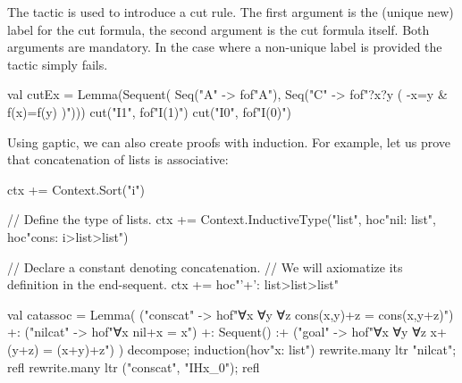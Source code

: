 \documentclass[a4paper,11pt]{article}
\newcommand{\cli}[1]{{\ttfamily {#1}}}
\begin{document}
The \cli{cut} tactic is used to introduce a cut rule. The first argument is the
(unique new) label for the cut formula, the second argument is the cut formula
itself. Both arguments are mandatory. In the case where a non-unique label is
provided the tactic simply fails.
\begin{tacticslisting}
val cutEx = Lemma(Sequent(
    Seq("A" -> fof"A"),
    Seq("C" -> fof"?x?y ( -x=y & f(x)=f(y) )"))) {
  cut("I1", fof"I(1)")
  cut("I0", fof"I(0)")
}
\end{tacticslisting}

Using gaptic, we can also create proofs with induction.  For example, let us
prove that concatenation of lists is associative:

\begin{tacticslisting}[nosig]
ctx += Context.Sort("i")

// Define the type of lists.
ctx += Context.InductiveType("list",
  hoc"nil: list",
  hoc"cons: i>list>list")

// Declare a constant denoting concatenation.
// We will axiomatize its definition in the end-sequent.
ctx += hoc"'+': list>list>list"

val catassoc =
  Lemma(
      ("conscat" -> hof"∀x ∀y ∀z cons(x,y)+z = cons(x,y+z)") +:
      ("nilcat" -> hof"∀x nil+x = x") +:
      Sequent()
      :+ ("goal" -> hof"∀x ∀y ∀z x+(y+z) = (x+y)+z")
    ) {
  decompose; induction(hov"x: list")
  rewrite.many ltr "nilcat"; refl
  rewrite.many ltr ("conscat", "IHx_0"); refl
}
\end{tacticslisting}
\begin{tacticsoutput}
\end{tacticsoutput}
\end{document}
